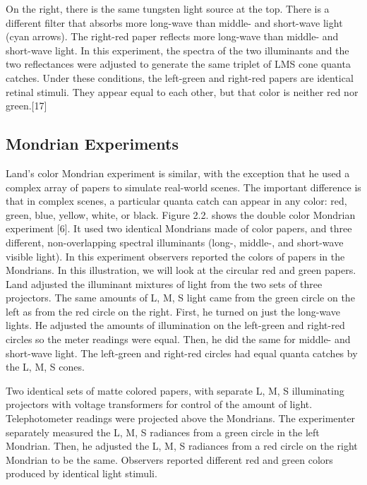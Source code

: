 
On the right, there is the same tungsten light source at the top. There is a different filter that absorbs more long-wave than middle- and short-wave light (cyan arrows). The right-red paper reflects more long-wave than middle- and short-wave light. In this experiment, the spectra of the two illuminants and the two reflectances were adjusted to generate the same triplet of LMS cone quanta catches. Under these conditions, the left-green and right-red papers are identical retinal stimuli. They appear equal to each other, but that color is neither red nor green.[17]

\subsection{Mondrian Experiments}
Land’s color Mondrian experiment is similar, with the exception that he used a complex array of papers to simulate real-world scenes. The important difference is that in complex scenes, a particular quanta catch can appear in any color: red, green, blue, yellow, white, or black.
Figure 2.2. shows the double color Mondrian experiment [6]. It used two identical Mondrians made of color papers, and three different, non-overlapping spectral illuminants (long-, middle-, and short-wave visible light). In this experiment observers reported the colors of papers in the Mondrians. In this illustration, we will look at the circular red and green papers. Land adjusted the illuminant mixtures of light from the two sets of three projectors. The same amounts of L, M, S light came from the green circle on the left as from the red circle on the right. First, he turned on just the long-wave lights. He adjusted the amounts of illumination on the left-green and right-red circles so the meter readings were equal. Then, he did the same for middle- and short-wave light. The left-green and right-red circles had equal quanta catches by the L, M, S cones.



Two identical sets of matte colored papers, with separate L, M, S illuminating projectors with voltage transformers for control of the amount of light. Telephotometer readings were projected above the Mondrians. The experimenter separately measured the L, M, S radiances from a green circle in the left Mondrian. Then, he adjusted the L, M, S radiances from a red circle on the right Mondrian to be the same. Observers reported different red and green colors produced by identical light stimuli.


